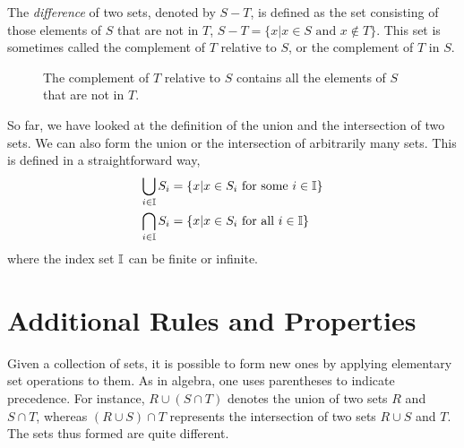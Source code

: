 The \emph{difference} of two sets, denoted by $S - T$, is defined as the set consisting of those elements of $S$ that are not in $T$, $S - T = \{ x | x \in S \text{ and } x \notin T \}$.
This set is sometimes called the complement of $T$ relative to $S$, or the complement of $T$ in $S$.

\begin{figure}[htb]
\begin{center}
\caption{The complement of $T$ relative to $S$ contains all the elements of $S$ that are not in $T$.}
\end{center}
\end{figure}

So far, we have looked at the definition of the union and the intersection of two sets.
We can also form the union or the intersection of arbitrarily many sets.
This is defined in a straightforward way,
\begin{align*}
\bigcup_{i \in \mathbb{I}} S_{i}
&= \{ x | x \in S_{i} \text{ for some } i \in \mathbb{I} \} \\
\bigcap_{i \in \mathbb{I}} S_{i}
&= \{ x | x \in S_{i} \text{ for all } i \in \mathbb{I} \}
\end{align*}
where the index set $\mathbb{I}$ can be finite or infinite.


\section{Additional Rules and Properties}

Given a collection of sets, it is possible to form new ones by applying elementary set operations to them.
As in algebra, one uses parentheses to indicate precedence.
For instance, $R \cup (S \cap T)$ denotes the union of two sets $R$ and $S \cap T$, whereas $(R \cup S) \cap T$ represents the intersection of two sets $R \cup S$ and $T$.
The sets thus formed are quite different.

